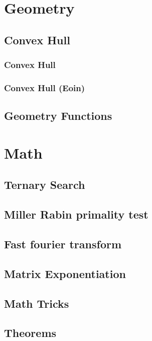 \documentclass[twocolumn, landscape]{report}
\begin{document}
    \chapter*{Geometry}
        \section{Convex Hull}
            \subsection{Convex Hull}
            
            \subsection{Convex Hull (Eoin)}
            
        \section{Geometry Functions}
            
            


    \chapter*{Math}
        \section{Ternary Search}
        
        \section{Miller Rabin primality test}
        
        \section{Fast fourier transform}
        
        \section{Matrix Exponentiation}
        
        \section{Math Tricks}
        
        \section{Theorems}
        
\end{document}
